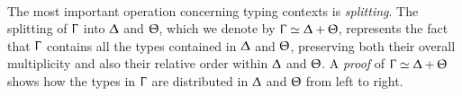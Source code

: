 \begin{code}%
\>[0]\AgdaSpace{}%
\AgdaSymbol{:}\AgdaSpace{}%
\<%
\\
\>[0]\AgdaSpace{}%
\AgdaSymbol{=}\AgdaSpace{}%
\AgdaSpace{}%
\<%
\end{code}

The most important operation concerning typing contexts is \emph{splitting}. The
splitting of $\Upgamma$ into $\Updelta$ and $\Uptheta$, which we denote by
$\Upgamma \simeq \Updelta + \Uptheta$, represents the fact that $\Upgamma$
contains all the types contained in $\Updelta$ and $\Uptheta$, preserving both
their overall multiplicity and also their relative order within $\Updelta$ and
$\Uptheta$. A \emph{proof} of $\Upgamma \simeq \Updelta + \Uptheta$ shows how
the types in $\Upgamma$ are distributed in $\Updelta$ and $\Uptheta$ from
left to right.

